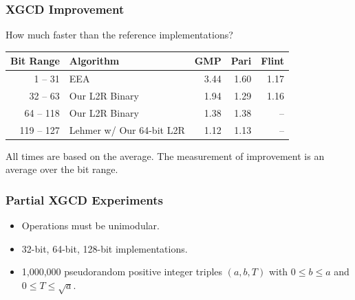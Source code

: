 \documentclass{beamer}
\newcommand{\smallfont}{\fontsize{6pt}{7.2}\selectfont}
\begin{document}
\begin{frame}
\frametitle{XGCD Improvement}

How much faster than the reference implementations?
\begin{table}
\centering
\begin{tabular}{ | r | l | r | r | r | }
\hline
Bit Range & Algorithm & GMP & Pari & Flint \\
\hline
1 -- 31 & EEA & 3.44 & 1.60 & 1.17 \\
32 -- 63 & Our L2R Binary & 1.94 & 1.29 & 1.16 \\
64 -- 118 & Our L2R Binary & 1.38 & 1.38 & -- \\
119 -- 127 & Lehmer w/ Our 64-bit L2R & 1.12 & 1.13 & -- \\
\hline
\end{tabular}
\end{table}

\bigskip
\smallfont
All times are based on the average.  The measurement of improvement is an average over the bit range.
\end{frame}


\begin{frame}
\frametitle{Partial XGCD Experiments}
\begin{itemize}
\item Operations must be unimodular.
\item 32-bit, 64-bit, 128-bit implementations.
\item 1,000,000 pseudorandom positive integer triples $(a, b, T)$ with $0 \le b \le a$ and $0 \le T \le \sqrt a$.
\end{itemize}

\end{frame}
\end{document}
